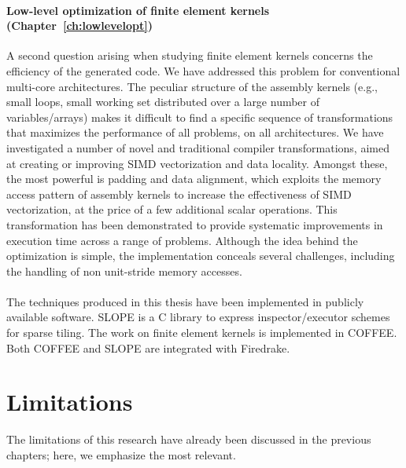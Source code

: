 \paragraph{Low-level optimization of finite element kernels (Chapter~\ref{ch:lowlevelopt})}
A second question arising when studying finite element kernels concerns the efficiency of the generated code. We have addressed this problem for conventional multi-core architectures. The peculiar structure of the assembly kernels (e.g., small loops, small working set distributed over a large number of variables/arrays) makes it difficult to find a specific sequence of transformations that maximizes the performance of all problems, on all architectures. We have investigated a number of novel and traditional compiler transformations, aimed at creating or improving SIMD vectorization and data locality. Amongst these, the most powerful is padding and data alignment, which exploits the memory access pattern of assembly kernels to increase the effectiveness of SIMD vectorization, at the price of a few additional scalar operations. This transformation has been demonstrated to provide systematic improvements in execution time across a range of problems. Although the idea behind the optimization is simple, the implementation conceals several challenges, including the handling of non unit-stride memory accesses.
~\\ 
~\\
The techniques produced in this thesis have been implemented in publicly available software. SLOPE is a C library to express inspector/executor schemes for sparse tiling. The work on finite element kernels is implemented in COFFEE. Both COFFEE and SLOPE are integrated with Firedrake.

\section{Limitations}
The limitations of this research have already been discussed in the previous chapters; here, we emphasize the most relevant.

